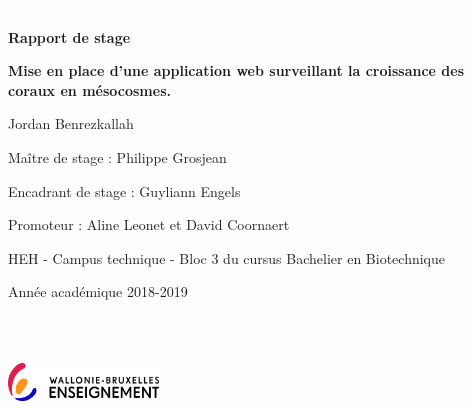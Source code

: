 \documentclass[]{report}
\begin{document}
\begin{centering}
\textcolor{white}{.}

\vspace{2.0 cm}

\Huge

{\bf Rapport de stage}

\vspace{1 cm}

\huge 
{\bf Mise en place d'une application web surveillant la croissance des coraux en mésocosmes.}

\vspace{1 cm}

\Large

Jordan Benrezkallah

\vspace{2 cm}

\normalsize
Maître de stage : Philippe Grosjean

Encadrant de stage : Guyliann Engels

Promoteur : Aline Leonet et David Coornaert


\vspace{2.5 cm}

\normalsize
HEH - Campus technique -
Bloc 3 du cursus Bachelier en Biotechnique

Année académique 2018-2019

\end {centering}

\includegraphics[width=4cm, height=3.5cm]{../image/fede.jpg}

\newpage

\null
\newpage

\end{document}
